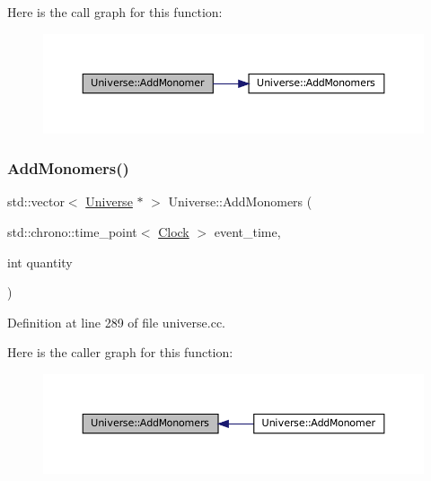 Here is the call graph for this function\+:\nopagebreak
\begin{figure}[H]
\begin{center}
\leavevmode
\includegraphics[width=350pt]{class_universe_a062a9472f0400e566ecc7dc056d989d9_cgraph}
\end{center}
\end{figure}
\mbox{\label{class_universe_a95fe7f99971bb2048121a7c4e87b9f79}} 
\subsubsection{\texorpdfstring{Add\+Monomers()}{AddMonomers()}}
{\footnotesize\ttfamily std\+::vector$<$ \mbox{\hyperlink{class_universe}{Universe}} $\ast$ $>$ Universe\+::\+Add\+Monomers (\begin{DoxyParamCaption}\item[{std\+::chrono\+::time\+\_\+point$<$ \mbox{\hyperlink{universe_8h_a0ef8d951d1ca5ab3cfaf7ab4c7a6fd80}{Clock}} $>$}]{event\+\_\+time,  }\item[{int}]{quantity }\end{DoxyParamCaption})}



Definition at line 289 of file universe.\+cc.

Here is the caller graph for this function\+:\nopagebreak
\begin{figure}[H]
\begin{center}
\leavevmode
\includegraphics[width=350pt]{class_universe_a95fe7f99971bb2048121a7c4e87b9f79_icgraph}
\end{center}
\end{figure}
\mbox{\label{class_universe_a8508b791c6997d8abcdcc037a6776734}} 
